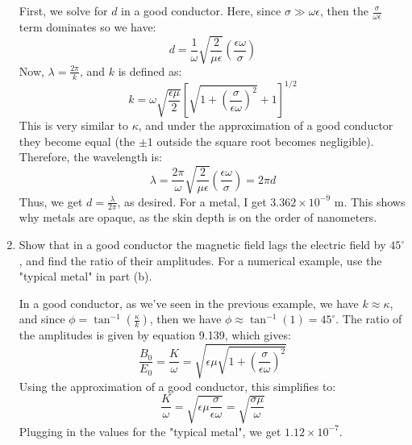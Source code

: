 \documentclass[10pt]{article}
\begin{document}
\begin{enumerate}[label=(\alph*)]
			\begin{solution}
				First, we solve for \( d \) in a good conductor. Here, since \( \sigma \gg \omega \epsilon
				\), then the \( \frac{\sigma}{\omega \epsilon} \) term dominates so we have:
				\[
					d = \frac{1}{\omega}\sqrt{\frac{2}{\mu \epsilon}}\left( \frac{\epsilon \omega}{\sigma}
					\right) 
				\]
				Now, \( \lambda = \frac{2\pi}{k} \), and \( k \) is defined as:
				\[
					k = \omega \sqrt{\frac{\epsilon \mu}{2}} \left[ \sqrt{1 + \left( \frac{\sigma}{\epsilon
					\omega} \right)^2} + 1 \right]^{1 / 2}
				\]
				This is very similar to \( \kappa \), and under the approximation of a good conductor they
				become equal (the \( \pm 1 \) outside the square root becomes negligible). 
				Therefore, the wavelength is:  
				\[
					\lambda = \frac{2\pi}{\omega}\sqrt{\frac{2}{\mu \epsilon}} \left( \frac{\epsilon
					\omega}{\sigma} \right) = 2\pi d
				\]
				Thus, we get \( d = \frac{\lambda}{2\pi} \), as desired. For a metal, I get \( 3.362 \times
				10^{-9} \) m. This shows why metals are opaque, as the skin depth is on the order of
				nanometers.  
			\end{solution}
		\item Show that in a good conductor the magnetic field lags the electric field by \( 45^{\circ} \),
			and find the ratio of their amplitudes. For a numerical example, use the "typical metal" in part
			(b).  

			\begin{solution}
				In a good conductor, as we've seen in the previous example, we have \( k \approx \kappa \),
				and since \( \phi = \tan^{-1}\left( \frac{\kappa}{k} \right) \), then we have \( \phi \approx
				\tan^{-1}(1) = 45^{\circ} \). The ratio of the amplitudes is given by equation 9.139, which
				gives:
				\[
					\frac{B_0}{E_0} = \frac{K}{\omega} = \sqrt{\epsilon \mu \sqrt{1 + \left(
					\frac{\sigma}{\epsilon \omega} \right)^2}}
				\]
				Using the approximation of a good conductor, this simplifies to:
				\[
					\frac{K}{\omega} = \sqrt{\epsilon \mu \frac{\sigma}{\epsilon \omega}} =
					\sqrt{\frac{\sigma \mu}{\omega}}
				\]
				Plugging in the values for the "typical metal", we get \( 1.12 \times 10^{-7} \).
			\end{solution}
	\end{enumerate}

	\pagebreak
\end{document}
